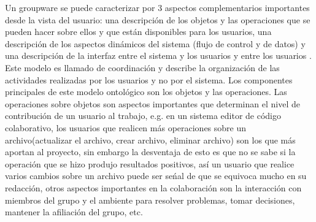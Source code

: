 Un groupware se puede caracterizar por 3 aspectos complementarios importantes desde la vista del usuario: una descripci\'on de los objetos y las operaciones que se pueden hacer sobre ellos y que est\'an disponibles para los usuarios, una descripci\'on de los aspectos din\'amicos del sistema (flujo de control y  de datos) y una descripci\'on de la interfaz entre el sistema y los usuarios y entre los usuarios \cite{ellis1994conceptual}. Este modelo es llamado de coordinaci\'on y describe la organizaci\'on de las actividades realizadas por los usuarios y no por el sistema. Los componentes principales de este modelo ontol\'ogico son los objetos y las operaciones. Las operaciones sobre objetos son aspectos importantes que determinan el nivel de contribuci\'on de un usuario al trabajo\cite{ellis1994conceptual}, e.g. en un sistema editor de c\'odigo colaborativo, los usuarios que realicen m\'as operaciones sobre un archivo(actualizar el archivo, crear archivo, eliminar archivo) son los que m\'as aportan al proyecto, sin embargo la desventaja de esto es que no se sabe si la operaci\'on que se hizo produjo resultados positivos, as\'i un usuario que realice varios cambios sobre un archivo puede ser se\'nal de que se equivoca mucho en su redacci\'on, otros aspectos importantes en la colaboraci\'on son la interacci\'on con miembros del grupo y el ambiente para resolver problemas, tomar decisiones, mantener la afiliaci\'on del grupo, etc.

